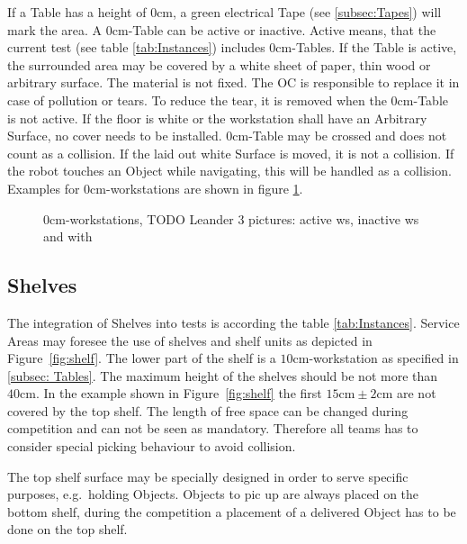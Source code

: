 If a Table has a height of $0\si{\centi\meter}$, a green electrical Tape (see \ref{subsec:Tapes}) will mark the area. A $0\si{\centi\meter}$-Table can be active or inactive. Active means, that the current test (see table \ref{tab:Instances}) includes $0\si{\centi\meter}$-Tables.
If the Table is active, the surrounded area may be covered by a white sheet of paper, thin wood or arbitrary surface. The material is not fixed.
The OC is responsible to replace it in case of pollution or tears. To reduce the tear, it is removed when the $0\si{\centi\meter}$-Table is not active. If the floor is white or the workstation shall have an Arbitrary Surface, no cover needs to be installed.
$0\si{\centi\meter}$-Table may be crossed and does not count as a collision. If the laid out white Surface is moved, it is not a collision.
If the robot touches an Object while navigating, this will be handled as a collision. Examples for $0\si{\centi\meter}$-workstations are shown in figure \ref{fig:0cmws}.

\begin{figure} [h!]
	\begin{center}
		\missingfigure[figwidth=6cm]{}	
	\end{center}
	\caption{$0\si{\centi\meter}$-workstations, TODO Leander 3 pictures: active ws, inactive ws and with }
	\label{fig:0cmws}
\end{figure}

\subsection{Shelves}\label{sec:Shelves}

The integration of Shelves into tests is according the table \ref{tab:Instances}. Service Areas may foresee the use of shelves and shelf units as depicted in Figure~\ref{fig:shelf}. The lower part of the shelf is a $10\si{\centi\meter}$-workstation as specified in \ref{subsec: Tables}.
The maximum height of the shelves should be not more than $40\si{\centi\meter}$. In the example shown in Figure~\ref{fig:shelf} the first $15 \si{\centi\meter}\pm 2\si{\centi\meter} $ are not covered by the top shelf. The length of free space can be changed during competition and can not be seen as mandatory. Therefore all teams has to consider special picking behaviour to avoid collision.  

The top shelf surface may be specially designed in order to serve specific purposes, e.g.\, holding Objects. Objects to pic up are always placed on the bottom shelf, during the competition a placement of a delivered Object has to be done on the top shelf.  

